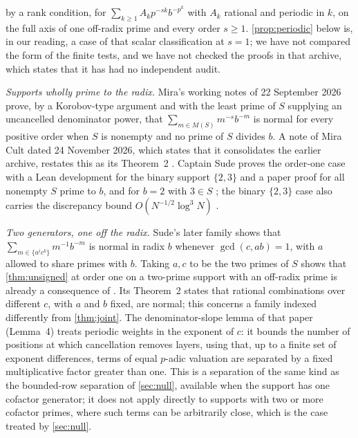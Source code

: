 \documentclass[11pt]{article}
\begin{document}
by a rank condition, for $\sum_{k\ge1}A_kp^{-sk}b^{-p^k}$ with $A_k$ rational and periodic in $k$, on the full axis of one off-radix prime and every order $s\ge1$. \cref{prop:periodic} below is, in our reading, a case of that scalar classification at $s=1$; we have not compared the form of the finite tests, and we have not checked the proofs in that archive, which states that it has had no independent audit.

\emph{Supports wholly prime to the radix.} Mira's working notes of 22 September 2026 \cite[S09, Theorem~1; see also T30]{mira} prove, by a Korobov-type argument and with the least prime of $S$ supplying an uncancelled denominator power, that $\sum_{m\in M(S)}m^{-s}b^{-m}$ is normal for every positive order when $S$ is nonempty and no prime of $S$ divides $b$. A note of Mira Cult dated 24 November 2026, which states that it consolidates the earlier archive, restates this as its Theorem~2 \cite{miracult}. Captain Sude proves the order-one case with a Lean development for the binary support $\{2,3\}$ and a paper proof for all nonempty $S$ prime to $b$, and for $b=2$ with $3\in S$ \cite[Theorems~1.1 and 5.1]{localized}; the binary $\{2,3\}$ case also carries the discrepancy bound $O(N^{-1/2}\log^3N)$ \cite[Theorem~4.1]{localized}.

\emph{Two generators, one off the radix.} Sude's later family \cite[Theorem~1]{xifamily} shows that $\sum_{m\in\{a^ic^k\}}m^{-1}b^{-m}$ is normal in radix $b$ whenever $\gcd(c,ab)=1$, with $a$ allowed to share primes with $b$. Taking $a,c$ to be the two primes of $S$ shows that \cref{thm:unsigned} at order one on a two-prime support with an off-radix prime is already a consequence of \cite[Theorem~1]{xifamily}. Its Theorem~2 states that rational combinations over different $c$, with $a$ and $b$ fixed, are normal; this concerns a family indexed differently from \cref{thm:joint}. The denominator-slope lemma of that paper (Lemma~4) treats periodic weights in the exponent of $c$: it bounds the number of positions at which cancellation removes layers, using that, up to a finite set of exponent differences, terms of equal $p$-adic valuation are separated by a fixed multiplicative factor greater than one. This is a separation of the same kind as the bounded-row separation of \cref{sec:null}, available when the support has one cofactor generator; it does not apply directly to supports with two or more cofactor primes, where such terms can be arbitrarily close, which is the case treated by \cref{sec:null}.
\end{document}
